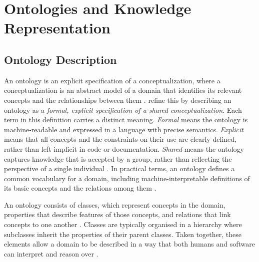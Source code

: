 \section{Ontologies and Knowledge Representation}

\subsection{Ontology Description}

An ontology is an explicit specification of a conceptualization,
where a conceptualization is an abstract model of a domain that
identifies its relevant concepts and the relationships between them
\parencite{gruber1995toward_principles_design_ontologies_used_knowledge_sharing}.
\textcite{studer1998knowledge_engineering_principles_methods} refine
this by describing an ontology as a
\textit{formal, explicit specification of a shared conceptualization}.
Each term in this definition carries a distinct meaning.
\textit{Formal} means the ontology is machine-readable and expressed
in a language with precise semantics.
\textit{Explicit} means that all concepts and the constraints on
their use are clearly defined, rather than left implicit in code or
documentation.
\textit{Shared} means the ontology captures knowledge that is
accepted by a group, rather than reflecting the perspective of
a single individual
\parencite{studer1998knowledge_engineering_principles_methods}.
In practical terms, an ontology defines a common vocabulary for a
domain, including machine-interpretable definitions of its basic
concepts and the relations among them
\parencite{noy2001ontology_development_101_guide_creating_first_ontology}.

An ontology consists of classes, which represent concepts in the
domain, properties that describe features of those concepts, and
relations that link concepts to one another
\parencite{noy2001ontology_development_101_guide_creating_first_ontology}.
Classes are typically organised in a hierarchy where subclasses
inherit the properties of their parent classes.
Taken together, these elements allow a domain to be described in a
way that both humans and software can interpret and reason over
\parencite{gruber1995toward_principles_design_ontologies_used_knowledge_sharing}.

